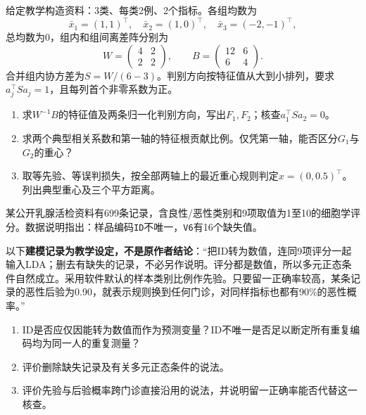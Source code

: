 给定教学构造资料：3类、每类2例、2个指标。各组均数为
\[
\bar x_1=(1,1)^\top,\quad \bar x_2=(1,0)^\top,\quad
\bar x_3=(-2,-1)^\top,
\]
总均数为0，组内和组间离差阵分别为
\[
W=\begin{pmatrix}4&2\\2&2\end{pmatrix},\qquad
B=\begin{pmatrix}12&6\\6&4\end{pmatrix}.
\]
合并组内协方差为$S=W/(6-3)$。判别方向按特征值从大到小排列，要求$a_j^\top Sa_j=1$，且每列首个非零系数为正。
\begin{enumerate}[label=（\arabic*）]
\item 求$W^{-1}B$的特征值及两条归一化判别方向，写出$F_1,F_2$；核查$a_1^\top Sa_2=0$。
\item 求两个典型相关系数和第一轴的特征根贡献比例。仅凭第一轴，能否区分$G_1$与$G_2$的重心？
\item 取等先验、等误判损失，按全部两轴上的最近重心规则判定$x=(0,0.5)^\top$。列出典型重心及三个平方距离。
\end{enumerate}

某公开乳腺活检资料有699条记录，含良性/恶性类别和9项取值为1至10的细胞学评分。数据说明指出：样品编码\texttt{ID}不唯一，\texttt{V6}有16个缺失值。

以下\textbf{建模记录为教学设定，不是原作者结论}：“把ID转为数值，连同9项评分一起输入LDA；删去有缺失的记录，不必另作说明。评分都是数值，所以多元正态条件自然成立。采用软件默认的样本类别比例作先验。只要留一正确率较高，某条记录的恶性后验为0.90，就表示规则换到任何门诊，对同样指标也都有90\%的恶性概率。”
\begin{enumerate}[label=（\arabic*）]
\item ID是否应仅因能转为数值而作为预测变量？ID不唯一是否足以断定所有重复编码均为同一人的重复测量？
\item 评价删除缺失记录及有关多元正态条件的说法。
\item 评价先验与后验概率跨门诊直接沿用的说法，并说明留一正确率能否代替这一核查。
\end{enumerate}
